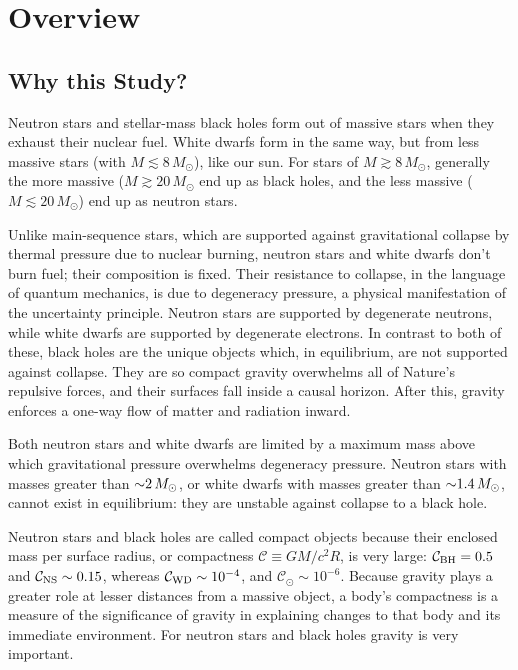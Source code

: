 \chapter{Overview}
\label{chap:overview}

\section{Why this Study?}

Neutron stars and stellar-mass black holes form out of massive stars when they
exhaust their nuclear fuel. White dwarfs form in the same way, but from less
massive stars (with $M\lesssim 8\,M_{\odot}$), like our sun.
For stars of $M\gtrsim 8\,M_{\odot}$, generally the more massive
($M\gtrsim 20\,M_{\odot}$ end up as black holes, and the less massive
($M\lesssim 20\,M_{\odot}$) end up as neutron stars.
\citep{woos2002-review_stellar_evolution}

Unlike main-sequence stars, which are supported against gravitational collapse
by thermal pressure due to nuclear burning, neutron stars and white dwarfs
don't burn fuel; their composition is fixed.
Their resistance to collapse, in the language of quantum mechanics, is due
to degeneracy pressure, a physical manifestation of the uncertainty principle.
Neutron stars are supported by degenerate neutrons, while white dwarfs are
supported by degenerate electrons. In contrast to both of these, black holes
are the unique objects which, in equilibrium, are not supported against
collapse. They are so compact gravity overwhelms all of Nature's repulsive
forces, and their surfaces fall inside a causal horizon. After this, gravity
enforces a one-way flow of matter and radiation inward.

Both neutron stars and white dwarfs are limited by a maximum mass above which
gravitational pressure overwhelms degeneracy pressure. Neutron stars with masses
greater than $\mathord{\sim}2\,M_\odot$, or white dwarfs with masses greater than
$\mathord{\sim}1.4\,M_\odot$, cannot exist in equilibrium: they are unstable against
collapse to a black hole.

Neutron stars and black holes are called compact objects because their enclosed
mass per surface radius, or compactness $\mathcal{C}\equiv G M/c^2 R$, is very
large:
$\mathcal{C}_{\rm BH}=0.5$ and
$\mathcal{C}_{\rm NS}\sim0.15$,
whereas $\mathcal{C}_{\rm WD}\sim10^{-4}$, and $\mathcal{C}_{\odot}\sim10^{-6}$.
Because gravity plays a greater role at lesser distances from a massive object,
a body's compactness is a measure of the significance of gravity
in explaining changes to that body and its immediate environment.
For neutron stars and black holes gravity is very important.

